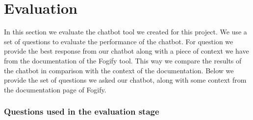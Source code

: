 \section{Evaluation}
\label{sec:evaluation}
In this section we evaluate the chatbot tool we created for this project. We
use a set of questions to evaluate the performance of the chatbot. For question
we provide the best response from our chatbot along with a piece of context we
have from the documentation of the Fogify tool. This way we compare the results
of the chatbot in comparison with the context of the documentation. Below we
provide the set of questions we asked our chatbot, along with some context from
the documentation page of Fogify.

\subsubsection*{Questions used in the evaluation stage}
